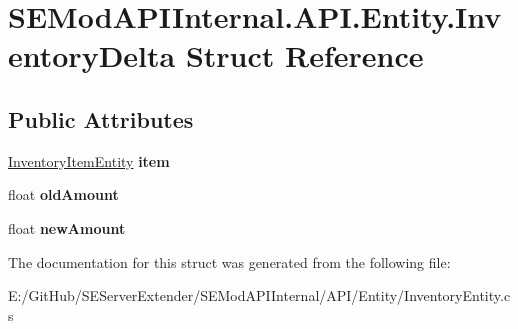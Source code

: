 \hypertarget{struct_s_e_mod_a_p_i_internal_1_1_a_p_i_1_1_entity_1_1_inventory_delta}{}\section{S\+E\+Mod\+A\+P\+I\+Internal.\+A\+P\+I.\+Entity.\+Inventory\+Delta Struct Reference}
\label{struct_s_e_mod_a_p_i_internal_1_1_a_p_i_1_1_entity_1_1_inventory_delta}
\subsection*{Public Attributes}
\begin{DoxyCompactItemize}
\item 
\hypertarget{struct_s_e_mod_a_p_i_internal_1_1_a_p_i_1_1_entity_1_1_inventory_delta_a4acdd928934952bff7f4080d9274779c}{}\hyperlink{class_s_e_mod_a_p_i_internal_1_1_a_p_i_1_1_entity_1_1_inventory_item_entity}{Inventory\+Item\+Entity} {\bfseries item}\label{struct_s_e_mod_a_p_i_internal_1_1_a_p_i_1_1_entity_1_1_inventory_delta_a4acdd928934952bff7f4080d9274779c}

\item 
\hypertarget{struct_s_e_mod_a_p_i_internal_1_1_a_p_i_1_1_entity_1_1_inventory_delta_a8c2ebf4cc872d3d883d1fd62c15580d3}{}float {\bfseries old\+Amount}\label{struct_s_e_mod_a_p_i_internal_1_1_a_p_i_1_1_entity_1_1_inventory_delta_a8c2ebf4cc872d3d883d1fd62c15580d3}

\item 
\hypertarget{struct_s_e_mod_a_p_i_internal_1_1_a_p_i_1_1_entity_1_1_inventory_delta_aae2b6b9f2ccb171ea4936b7b9bfe88bc}{}float {\bfseries new\+Amount}\label{struct_s_e_mod_a_p_i_internal_1_1_a_p_i_1_1_entity_1_1_inventory_delta_aae2b6b9f2ccb171ea4936b7b9bfe88bc}

\end{DoxyCompactItemize}


The documentation for this struct was generated from the following file\+:\begin{DoxyCompactItemize}
\item 
E\+:/\+Git\+Hub/\+S\+E\+Server\+Extender/\+S\+E\+Mod\+A\+P\+I\+Internal/\+A\+P\+I/\+Entity/Inventory\+Entity.\+cs\end{DoxyCompactItemize}
